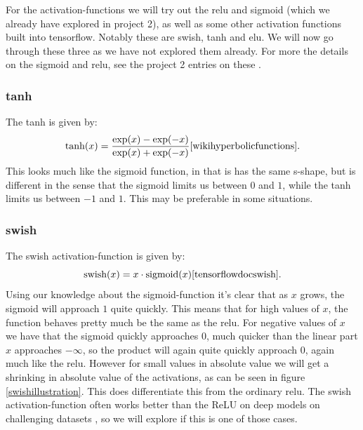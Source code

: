 \documentclass{article}
\begin{document}
For the activation-functions we will try out the relu and sigmoid (which we
already have explored in project 2), as well as some other activation functions
built into tensorflow. Notably these are swish, tanh and elu. We will now go
through these three as we have not explored them already. For more the details
on the sigmoid and relu, see the project 2 entries on these
\cite[s.~3.8]{reportproject2}.

\subsubsection{tanh}
The tanh is given by:
\[
	\text{tanh}(x) = \frac{\exp(x) - \exp(-x)}{\exp(x) + \exp(-x)} \cite{wikihyperbolicfunctions}.
\]
This looks much like the sigmoid function, in
that is has the same s-shape, but is different in the sense that the sigmoid
limits us between $0$ and $1$, while the tanh limits us between $-1$ and $1$.
This may be preferable in some situations.

\subsubsection{swish}
The swish activation-function is given by:
\[
	\text{swish}(x) = x \cdot \text{sigmoid}(x) \cite{tensorflowdocswish}.
\]
Using our knowledge about the sigmoid-function it's clear that as $x$ grows, the
sigmoid will approach $1$ quite quickly. This means that for high values of $x$,
the function behaves pretty much be the same as the relu. For negative values of
$x$ we have that the sigmoid quickly approaches $0$, much quicker than the
linear part $x$ approaches $-\infty$, so the product will again quite quickly
approach $0$, again much like the relu. However for small values in absolute
value we will get a shrinking in absolute value of the activations, as can be
seen in figure \ref{swishillustration}. This does differentiate this from the
ordinary relu. The swish activation-function often works better than the ReLU on
deep models on challenging datasets \cite{ramachandran2017searching}, so we will
explore if this is one of those cases.
\end{document}
